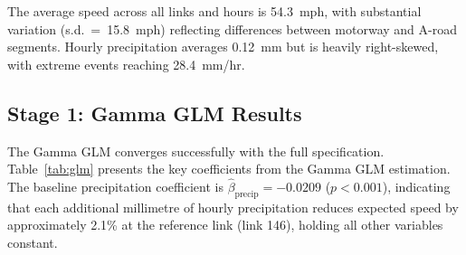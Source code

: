 \documentclass[review]{elsarticle}
\begin{document}
The average speed across all links and hours is 54.3~mph, with substantial variation (s.d.~=~15.8~mph) reflecting differences between motorway and A-road segments. Hourly precipitation averages 0.12~mm but is heavily right-skewed, with extreme events reaching 28.4~mm/hr.

\subsection{Stage 1: Gamma GLM Results}
\label{sec:results:glm}

The Gamma GLM converges successfully with the full specification. Table~\ref{tab:glm} presents the key coefficients from the Gamma GLM estimation. The baseline precipitation coefficient is $\hat{\beta}_{\text{precip}} = -0.0209$ ($p < 0.001$), indicating that each additional millimetre of hourly precipitation reduces expected speed by approximately 2.1\% at the reference link (link 146), holding all other variables constant.
\end{document}
